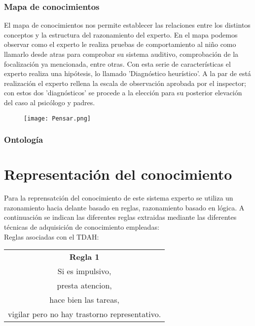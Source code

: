 \documentclass[letterpaper,12pt]{article}
\begin{document}
\newpage
\subsubsection{Mapa de conocimientos}
El mapa de conocimientos nos permite establecer las relaciones entre los
distintos conceptos y la estructura del razonamiento del experto.
En el mapa podemos observar como el experto le realiza pruebas de comportamiento al niño como llamarlo desde atras para comprobar su sistema auditivo, comprobación de la focalización ya mencionada, entre otras. Con esta serie de características el experto realiza una hipótesis, lo llamado ’Diagnóstico heurístico’. A la par de está realización el experto rellena la escala de observación aprobada por el inspector; con estos dos ’diagnósticos’ se procede a la elección para su posterior elevación del caso al psicólogo y padres.

\begin{figure}[h!]
				\begin{center}
					\texttt{[image: Pensar.png]}
				\end{center}
			\end{figure}
			
\clearpage
\subsubsection{Ontología}

\section{Representación del conocimiento}
Para la reprensatción del conocimiento de este sistema experto se utiliza
un razonamiento hacia delante basado en reglas, razonamiento basado en
lógica. A continuación se indican las diferentes reglas extraidas mediante las diferentes técnicas de adquisición de conocimiento empleadas: \\

Reglas asociadas con el TDAH:
\begin{center}
\begin{tabular}{|c|}
\hline 
\textbf{Regla 1} \\ 
Si es impulsivo, \\
presta atencion, \\
hace bien las tareas, \\
vigilar pero no hay trastorno representativo. \\
\hline 
\end{tabular} 
\end{center}
\end{document}
